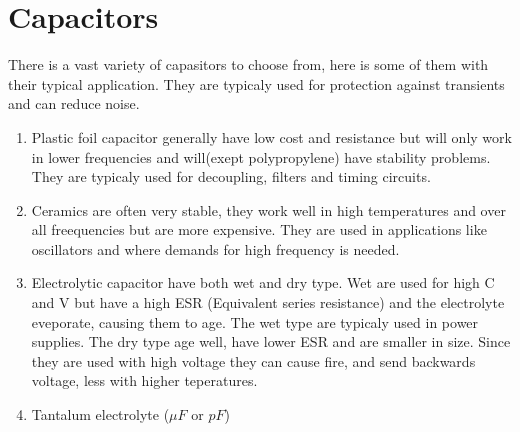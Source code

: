 \documentclass[12pt,a4paper]{article}
\begin{document}
    \section{Capacitors}
      There is a vast variety of capasitors to choose from, here is some
      of them with their typical application. They are typicaly used for
      protection against transients and can reduce noise. 
      \begin{enumerate}
        \item Plastic foil capacitor generally have low cost and
          resistance but will only work in lower frequencies and
          will(exept polypropylene) have stability problems. They are
          typicaly used for decoupling, filters and timing circuits. 
        \item Ceramics are often very stable, they work well in high
          temperatures and over all freequencies but are more
          expensive. They are used in applications like oscillators and
          where demands for high frequency is needed.
        \item Electrolytic capacitor have both wet and dry type. Wet are
          used for high C and V but have a high ESR (Equivalent series
          resistance) and the electrolyte eveporate, causing them to
          age. The wet type are typicaly used in power supplies.
          The dry type age well, have lower ESR and are smaller in size.
          Since they are used with high voltage they can cause fire, and
          send backwards voltage, less with higher teperatures. 
        \item Tantalum electrolyte ($\mu F$ or $pF$)
      \end{enumerate}
\end{document}
